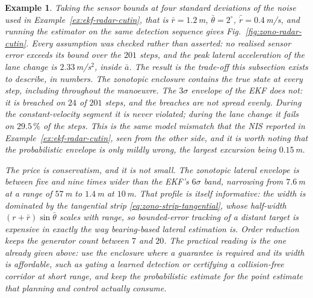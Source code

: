 \documentclass[11pt,oneside,openany]{book}
\newtheorem{example}{Example}[chapter]
\begin{document}
\begin{example}
Taking the sensor bounds at four standard deviations of the noise used in
Example~\ref{ex:ekf-radar-cutin}, that is $\bar r=1.2$\,m,
$\bar\theta=2^{\circ}$, $\bar{\dot r}=0.4$\,m/s, and running the estimator on
the same detection sequence gives Fig.~\ref{fig:zono-radar-cutin}. Every
assumption was checked rather than asserted: no realised sensor error exceeds
its bound over the $201$ steps, and the peak lateral acceleration of the lane
change is $2.33$\,m/s$^{2}$, inside $\bar a$. The result is the trade-off this
subsection exists to describe, in numbers. The zonotopic enclosure contains the
true state at \emph{every} step, including throughout the manoeuvre. The
$3\sigma$ envelope of the EKF does not: it is breached on $24$ of $201$ steps,
and the breaches are not spread evenly. During the constant-velocity segment it
is never violated; during the lane change it fails on $29.5\,\%$ of the steps.
This is the same model mismatch that the NIS reported in
Example~\ref{ex:ekf-radar-cutin}, seen from the other side, and it is worth
noting that the probabilistic envelope is only mildly wrong, the largest
excursion being $0.15$\,m.

The price is conservatism, and it is not small. The zonotopic lateral envelope
is between five and nine times wider than the EKF's $6\sigma$ band, narrowing
from $7.6$\,m at a range of $57$\,m to $1.4$\,m at $10$\,m. That profile is
itself informative: the width is dominated by the tangential strip
\eqref{eq:zono-strip-tangential}, whose half-width $(r+\bar r)\sin\bar\theta$
scales with range, so bounded-error tracking of a distant target is expensive
in exactly the way bearing-based lateral estimation is. Order reduction keeps
the generator count between $7$ and $20$. The practical reading is the one
already given above: use the enclosure where a guarantee is required and its
width is affordable, such as gating a learned detection or certifying a
collision-free corridor at short range, and keep the probabilistic estimate for
the point estimate that planning and control actually consume.
\end{example}
\end{document}
